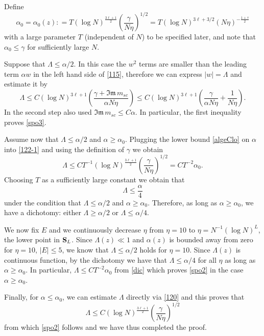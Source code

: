 \documentclass[draft]{article}
\newcommand{\al}{\alpha}
\newcommand{\be}{\begin{equation}}
\newcommand{\ee}{\end{equation}}
\newcommand{\im}{{\mathfrak{Im} \, }}
\newcommand{\bS}{ {\bf  S}}
\newcommand{\qed}{\hfill\fbox{}\par\vspace{0.3mm}}
\numberwithin{equation}{section}
\numberwithin{theorem}{section}
\numberwithin{definition}{section}
\numberwithin{remark}{section}
\begin{document}
Define
\be\label{algeClo}
\al_0=\al_0(z): =   T (\log N)^{ \frac{3 \ell+1}{2}}\left(\frac{\gamma}{N\eta}\right)^{1/2}
 =  T (\log N)^{ 3 \ell+ 3/2} (N\eta)^{-\frac { 1 + \tau } 2}
\ee
with  a large  parameter $T$ (independent of $N$) to be specified later,
and note that  $\al_0\le\gamma$ for sufficiently large $N$.


Suppose that  $\Lambda\leq \al/2$. In this case the $w^2$ terms are smaller than the leading term $\al w$
in the left hand side of \eqref{115}, therefore we can express $|w|=\Lambda$ and estimate
it by 
\be\label{122-1}
\Lambda \leq C(\log N)^{3 \ell+1}\left(\frac{\gamma+\im m_{sc} }{\al N\eta}\right)
\leq C(\log N)^{3  \ell+1}\left(\frac{\gamma}{\al N\eta}  + \frac{1  }{ N\eta}\right).
\ee
In the second step also used $\im m_{sc} \le C  \alpha  $.
In particular, the first inequality proves \eqref{spo3}.


Assume now that $\Lambda \le \alpha/2$ and  $\alpha \ge \alpha_0$. 
Plugging the lower bound 
 \eqref{algeClo} on $\alpha$ into  \eqref{122-1}
and using the definition of $\gamma$ we obtain
\be
\Lambda 
\leq  C T ^{-1} (\log N)^{ \frac{3 \ell+1}{2}} 
\left(\frac{\gamma}{N\eta}\right)^{1/2} = CT^{-2}\alpha_0 . 
\label{dic}
\ee
Choosing $T$ as a sufficiently large constant we obtain that
\be\label{122}
\Lambda\le \frac{\al}{4}
\ee
under the condition that $\Lambda \le \alpha/2$ and  $\alpha \ge \alpha_0$.
 Therefore, as long as $\al\ge \al_0$, we
have a dichotomy: either $\Lambda \ge \al/2$ or $\Lambda\le \al/4$. 

We now fix $E$ and we continuously decrease $\eta$ from $\eta=10$ to
 $\eta = N^{-1}(\log N)^L$, the
lower point in $\bS_L$.  Since  $\Lambda(z)\ll 1$ and $\alpha(z)$ is bounded away from zero
for $\eta=10$, $|E|\le 5$,  we know that $\Lambda\le \al/2$ holds for $\eta=10$.
Since $\Lambda(z)$ is continuous function, by the dichotomy 
we have that $\Lambda\le \al/4$  for all $\eta$ as long as
$\alpha \ge \alpha_0$. In particular, $\Lambda\le  CT^{-2}\alpha_0$ from \eqref{dic}
which proves  \eqref{spo2} in the case $\al\ge \al_0$.
 
Finally, for $\alpha \le \alpha_0$, we can estimate $\Lambda$ directly via \eqref{120} 
and this proves that 
\be\label{122-2}
\Lambda 
\leq  C  (\log N)^{ \frac{3 \ell+1}{2}} \left(\frac{\gamma}{N\eta}\right)^{1/2}
\ee
from which  \eqref{spo2} follows
and we have thus completed the proof. 
\qed



\medskip
\end{document}
